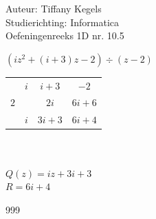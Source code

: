 \documentclass[a4paper]{article}
\begin{document}
  
\noindent \large Auteur: Tiffany Kegels \\
\noindent \large Studierichting: Informatica\\
\noindent \large Oefeningenreeks 1D nr. 10.5\\

\medskip

\normalsize

$(iz^2 + (i+3)z -2) \div (z-2)$\\

\begin{tabular}{c|ccc}
    & $i$ & $i+3$   & $-2$\\
$2$ &     & $2i$    & $6i+6$\\ \hline
    & $i$ & $3i+3$  & $6i+4$\\
\end{tabular}\\\\

$Q(z) = iz + 3i + 3$\\

$R = 6i + 4$\\

\begin{thebibliography}{999}

\end{thebibliography}
\end{document}
